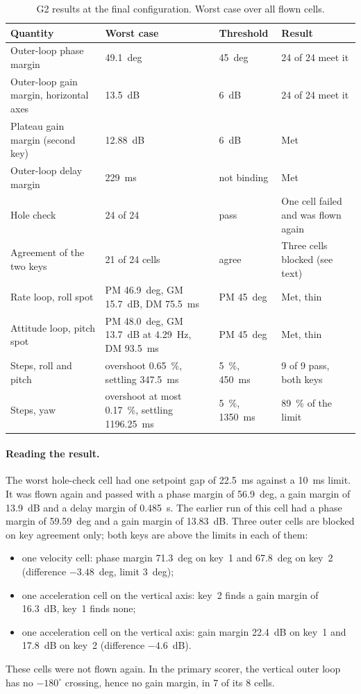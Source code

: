 \begin{table}[tbp]
\caption{G2 results at the final configuration. Worst case over all flown cells.}\label{tab:val_g2}
\centering
\small
\begin{tabularx}{\textwidth}{@{}L{4.6cm} L{3.2cm} L{2.2cm} Y@{}}
\toprule
Quantity & Worst case & Threshold & Result \\
\midrule
Outer-loop phase margin & 49.1~deg & 45~deg & 24 of 24 meet it \\
Outer-loop gain margin, horizontal axes & 13.5~dB & 6~dB & 24 of 24 meet it \\
Plateau gain margin (second key) & 12.88~dB & 6~dB & Met \\
Outer-loop delay margin & 229~ms & not binding & Met \\
Hole check & 24 of 24 & pass & One cell failed and was flown again \\
Agreement of the two keys & 21 of 24 cells & agree & Three cells blocked (see text) \\
Rate loop, roll spot & PM 46.9~deg, GM 15.7~dB, DM 75.5~ms & PM 45~deg & Met, thin \\
Attitude loop, pitch spot & PM 48.0~deg, GM 13.7~dB at 4.29~Hz, DM 93.5~ms & PM 45~deg & Met, thin \\
Steps, roll and pitch & overshoot 0.65~\%, settling 347.5~ms & 5~\%, 450~ms & 9 of 9 pass, both keys \\
Steps, yaw & overshoot at most 0.17~\%, settling 1196.25~ms & 5~\%, 1350~ms & 89~\% of the limit \\
\bottomrule
\end{tabularx}
\end{table}

\paragraph{Reading the result.}
The worst hole-check cell had one setpoint gap of 22.5~ms against a 10~ms limit.
It was flown again and passed with a phase margin of 56.9~deg, a gain margin of 13.9~dB and a delay margin of 0.485~s.
The earlier run of this cell had a phase margin of 59.59~deg and a gain margin of 13.83~dB.
Three outer cells are blocked on key agreement only; both keys are above the limits in each of them:
\begin{itemize}
  \item one velocity cell: phase margin 71.3~deg on key~1 and 67.8~deg on key~2 (difference $-3.48$~deg, limit 3~deg);
  \item one acceleration cell on the vertical axis: key~2 finds a gain margin of 16.3~dB, key~1 finds none;
  \item one acceleration cell on the vertical axis: gain margin 22.4~dB on key~1 and 17.8~dB on key~2 (difference $-4.6$~dB).
\end{itemize}
These cells were not flown again.
In the primary scorer, the vertical outer loop has no $-180^\circ$ crossing, hence no gain margin, in 7 of its 8 cells.

